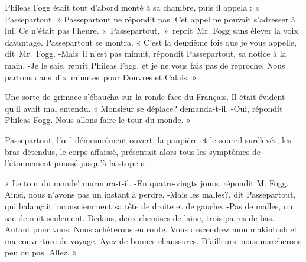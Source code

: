 \documentclass[]{book}
\begin{document}
               Phileas Fogg était tout d'abord monté 
               à sa chambre, puis il appela :
               « Passepartout. »\newline
               Passepartout ne répondit pas. Cet appel
               ne pouvait s'adresser à lui. Ce n'était pas 
               l'heure.
               « Passepartout, »\newline reprit Mr. Fogg sans 
               élever la voix davantage.
               Passepartout se montra.
               « C'est la deuxième fois que je vous 
               appelle, dit Mr. Fogg.\newline
               -Mais il n'est pas minuit, répondit
               Passepartout, sa notice à la main.\newline
               -Je le sais, reprit Phileas Fogg, et je
               ne vous fais pas de reproche. Nous partons dans dix minutes pour Douvres
               et Calais. »\newline 
               
               Une sorte de grimace s'ébaucha sur la 
               ronde face du Français. Il était évident
               qu'il avait mal entendu.
               « Monsieur se déplace? demanda-t-il.\newline
               -Oui, répondit Phileas Fogg. Nous allons faire le tour du monde. »\newline
            
               Passepartout, l'œil démesurément ouvert, la paupière et le sourcil surélevés,
               les bras détendus, le corps affaissé, présentait alors tous les symptômes de l'étonnement poussé jusqu'à la stupeur.
            
               « Le tour du monde! murmura-t-il.\newline
               -En quatre-vingts jours. répondit M.
               Fogg. Ainsi, nous n'avons pas un instant 
               à perdre.\newline
               -Mais les malles?. dit Passepartout, 
               qui balançait inconsciemment sa tête de 
               droite et de gauche.\newline
               -Pas de malles, un sac de nuit seulement. Dedans, deux chemises de laine,
               trois paires de bas. Autant pour vous. Nous 
               achèterons en route. Vous descendrez mon
               makintosh et ma couverture de voyage. 
               Ayez de bonnes chaussures. D'ailleurs,
               nous marcherons peu ou pas. Allez. » \newline
            
\end{document}
